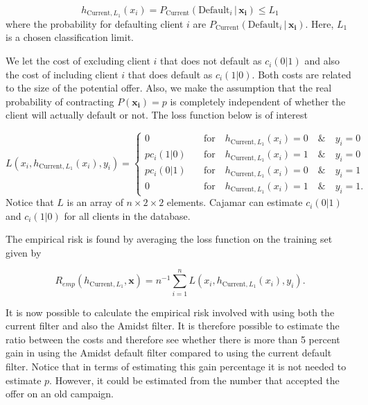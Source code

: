 \documentclass{article}
\theoremstyle{theorem}
\theoremstyle{definition}
\newcommand{\bv}[1]{\bm{#1}}
\begin{document}
{\begin{equation}
\label{def:empRisk}
h_{\mbox{Current},L_1}(x_i) = P_{\mbox{Current}}(\mbox{Default}_i \,|\, \bv{x_i}) \leq L_1 
\end{equation}
where the probability for defaulting client $i$ are $P_{\mbox{Current}}(\mbox{Default}_i \,|\, \bv{x_i})$.  Here, $L_1$ is a chosen classification limit. 

We let the cost of excluding client $i$ that does not default as $c_i(0|1)$ and also the cost of including client $i$ that does default as $c_i(1|0)$.  Both costs are related to the size of the potential offer.  Also, we make the assumption that the real probability of contracting $P(\bv{x_i}) = p$ is completely independent of whether the client will actually default or not.  The loss function below is of interest

\begin{equation}
\label{def:empRiskBank}
L(x_i, h_{\mbox{Current},L_1}(x_i) , y_i) = 
\begin{cases}
0     &\quad \mbox{for} \quad h_{\mbox{Current},L_1}(x_i) = 0 \quad \& \quad y_i = 0\\
p c_i(1|0)    &\quad \mbox{for} \quad h_{\mbox{Current},L_1}(x_i) = 1 \quad \& \quad y_i = 0\\
p c_i(0|1)      &\quad \mbox{for} \quad h_{\mbox{Current},L_1}(x_i) = 0 \quad \& \quad y_i = 1\\
0   &\quad \mbox{for} \quad h_{\mbox{Current},L_1}(x_i) = 1 \quad \& \quad y_i = 1.
\end{cases}
\end{equation}
Notice that $L$ is an array of $n \times 2\times 2$ elements. Cajamar can estimate $c_i(0|1)$ and $c_i(1|0)$ for all clients in the database.

The empirical risk is found by averaging the loss function on the training set given by 

\begin{equation}
\label{def:empRisk}
R_{emp}(h_{\mbox{Current},L_1}, \bv{x}) = n^{-1} \sum_{i=1}^n L(x_i, h_{\mbox{Current},L_1}(x_i), y_i).
\end{equation}

It is now possible to calculate the empirical risk involved with using both the current filter and also the Amidst filter.  It is therefore possible to estimate the ratio between the costs and therefore see whether there is more than 5 percent gain in using the Amidst default filter compared to using the current default filter.  Notice that in terms of estimating this gain percentage it is not needed to estimate $p$.  However, it could be estimated from the number that accepted the offer on an old campaign.


}
\end{document}
